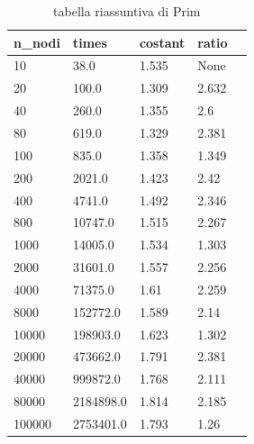 \renewcommand{\arraystretch}{2}
\begin{longtable}[H]{|p{2cm}|p{2cm}|p{3cm}|p{3cm}|p{3cm}|} 
\hline

    \rowcolor{lightgray}
    \textbf{n\_nodi} & \textbf{times} & \textbf{costant} & \textbf{ratio}\\ \hline\hline  \endhead
    10	&	38.0	&		1.535	&	None \\ \hline
    20	&	100.0	&		1.309	&	2.632 \\ \hline
    40	&	260.0	&		1.355 &		2.6     \\ \hline
    80	&	619.0	&		1.329 &		2.381  \\ \hline
    100	&	835.0	&		1.358 &		1.349 \\ \hline
    200	&	2021.0	&		1.423 &		2.42 \\ \hline
    400	&	4741.0	&		1.492 &		2.346 \\ \hline
    800	&	10747.0	&		1.515 &		2.267 \\ \hline
    1000 &	14005.0	&		1.534 &		1.303 \\ \hline
    2000 &	31601.0	&		1.557 &		2.256 \\ \hline
    4000 &	71375.0	&	    1.61 &		2.259 \\ \hline
    8000 &	152772.0 &		1.589 &		2.14 \\ \hline
    10000 &	198903.0 &		1.623 &		1.302 \\ \hline
    20000 &	473662.0 &		1.791 &		2.381 \\ \hline
    40000 &	999872.0 &		1.768 &		2.111 \\ \hline
    80000 &	2184898.0 &		1.814 &		2.185 \\ \hline
    100000 &	2753401.0 &	1.793 &		1.26  \hline
    
    \caption{tabella riassuntiva di Prim}
\end{longtable}

